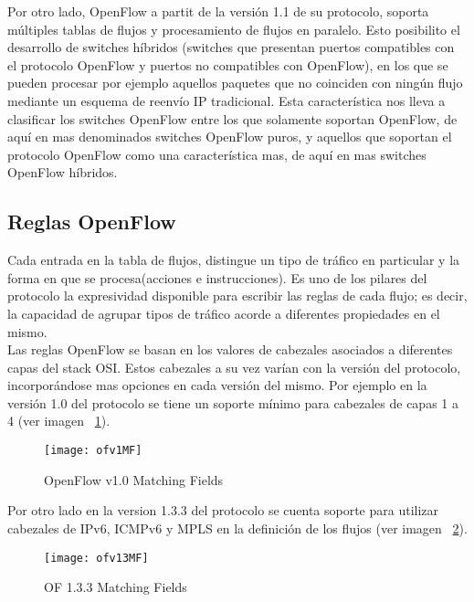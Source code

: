 Por otro lado, OpenFlow a partit de la versión 1.1 de su protocolo, soporta múltiples tablas de flujos y procesamiento de flujos en paralelo. Esto posibilito el desarrollo de switches híbridos (switches que presentan puertos compatibles con el protocolo OpenFlow y puertos no compatibles con OpenFlow), en los que se pueden procesar por ejemplo aquellos paquetes que no coinciden con ningún flujo mediante un esquema de reenvío IP tradicional. Esta característica nos lleva a clasificar los switches OpenFlow entre los que solamente soportan OpenFlow, de aquí en mas denominados switches OpenFlow puros, y aquellos que soportan el protocolo OpenFlow como una característica mas, de aquí en mas switches OpenFlow híbridos.

\subsection{Reglas OpenFlow}
Cada entrada en la tabla de flujos, distingue un tipo de tr\'afico en particular y la forma en que se procesa(acciones e instrucciones). Es uno de los pilares del protocolo la expresividad disponible para escribir las reglas de cada flujo; es decir, la capacidad de agrupar tipos de tr\'afico acorde a diferentes propiedades en el mismo.\\

Las reglas OpenFlow se basan en los valores de cabezales asociados a diferentes capas del stack OSI. Estos cabezales a su vez varían con la versi\'on del protocolo, incorporándose mas opciones en cada versi\'on del mismo. Por ejemplo en la versi\'on 1.0 del protocolo se tiene un soporte mínimo para cabezales de capas 1 a 4 (ver imagen ~\ref{fig:OF10MatchingFields}).

\begin{figure}[htbp!] 
\centering    
\texttt{[image: ofv1MF]}
\caption[OF 1.0 Matching Fields]{OpenFlow v1.0 Matching Fields}
\label{fig:OF10MatchingFields}
\end{figure}

Por otro lado en la version 1.3.3 del protocolo se cuenta soporte para utilizar cabezales de IPv6, ICMPv6 y MPLS en la definición de los flujos (ver imagen ~\ref{fig:OF13MatchingFields}).
 
\begin{figure}[htbp!] 
\centering    
\texttt{[image: ofv13MF]}
\caption[OF 1.3.3 Matching Fields]{OF 1.3.3 Matching Fields}
\label{fig:OF13MatchingFields}
\end{figure}

